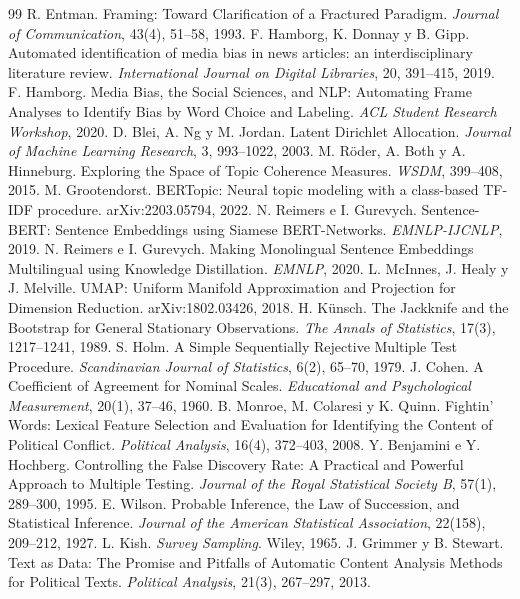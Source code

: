\documentclass[10pt,twocolumn]{article}
\begin{document}
{\small
\begin{thebibliography}{99}
\setlength{\itemsep}{1pt}
 R. Entman. Framing: Toward Clarification of a Fractured Paradigm. \emph{Journal of Communication}, 43(4), 51--58, 1993.
 F. Hamborg, K. Donnay y B. Gipp. Automated identification of media bias in news articles: an interdisciplinary literature review. \emph{International Journal on Digital Libraries}, 20, 391--415, 2019.
 F. Hamborg. Media Bias, the Social Sciences, and NLP: Automating Frame Analyses to Identify Bias by Word Choice and Labeling. \emph{ACL Student Research Workshop}, 2020.
 D. Blei, A. Ng y M. Jordan. Latent Dirichlet Allocation. \emph{Journal of Machine Learning Research}, 3, 993--1022, 2003.
 M. Röder, A. Both y A. Hinneburg. Exploring the Space of Topic Coherence Measures. \emph{WSDM}, 399--408, 2015.
 M. Grootendorst. BERTopic: Neural topic modeling with a class-based TF-IDF procedure. arXiv:2203.05794, 2022.
 N. Reimers e I. Gurevych. Sentence-BERT: Sentence Embeddings using Siamese BERT-Networks. \emph{EMNLP-IJCNLP}, 2019.
 N. Reimers e I. Gurevych. Making Monolingual Sentence Embeddings Multilingual using Knowledge Distillation. \emph{EMNLP}, 2020.
 L. McInnes, J. Healy y J. Melville. UMAP: Uniform Manifold Approximation and Projection for Dimension Reduction. arXiv:1802.03426, 2018.
 H. Künsch. The Jackknife and the Bootstrap for General Stationary Observations. \emph{The Annals of Statistics}, 17(3), 1217--1241, 1989.
 S. Holm. A Simple Sequentially Rejective Multiple Test Procedure. \emph{Scandinavian Journal of Statistics}, 6(2), 65--70, 1979.
 J. Cohen. A Coefficient of Agreement for Nominal Scales. \emph{Educational and Psychological Measurement}, 20(1), 37--46, 1960.
 B. Monroe, M. Colaresi y K. Quinn. Fightin' Words: Lexical Feature Selection and Evaluation for Identifying the Content of Political Conflict. \emph{Political Analysis}, 16(4), 372--403, 2008.
 Y. Benjamini e Y. Hochberg. Controlling the False Discovery Rate: A Practical and Powerful Approach to Multiple Testing. \emph{Journal of the Royal Statistical Society B}, 57(1), 289--300, 1995.
 E. Wilson. Probable Inference, the Law of Succession, and Statistical Inference. \emph{Journal of the American Statistical Association}, 22(158), 209--212, 1927.
 L. Kish. \emph{Survey Sampling}. Wiley, 1965.
 J. Grimmer y B. Stewart. Text as Data: The Promise and Pitfalls of Automatic Content Analysis Methods for Political Texts. \emph{Political Analysis}, 21(3), 267--297, 2013.
\end{thebibliography}
}
\end{document}
